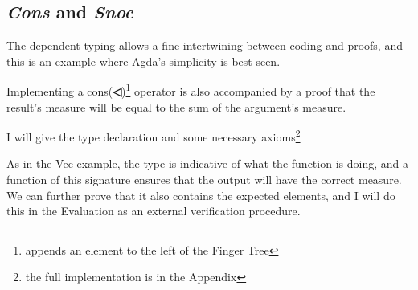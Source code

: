 \documentclass[12pt,twoside,notitlepage]{report}
\newcommand{\Conid}[1]{\mathit{#1}}
\newcommand{\Varid}[1]{\mathit{#1}}
\newcommand{\anonymous}{\kern0.06em \_}
\def\resethooks{%
  \global\let\SaveRestoreHook\empty
  \global\let\ColumnHook\empty}
\newcommand{\hsindent}[1]{\quad}%
\let\hspre\empty
\let\hspost\empty
\begin{document}
\subsection{\textit{Cons} and \textit{Snoc}}

The dependent typing allows a fine intertwining between coding and proofs, and this is an example where Agda's simplicity is best seen.

Implementing a cons(\textbf{◁})\footnote{appends an element to the left of the Finger Tree} operator is also accompanied by a proof that the result's measure will be equal to the sum of the argument's measure.

I will give the type declaration and some necessary axioms\footnote{the full implementation is in the Appendix}

\resethooks

As in the Vec example, the type is indicative of what the function is doing, and a function of this signature
ensures that the output will have the correct measure. We can further prove that it also contains the expected elements, and I will do this in the Evaluation as an external verification procedure.
\end{document}
